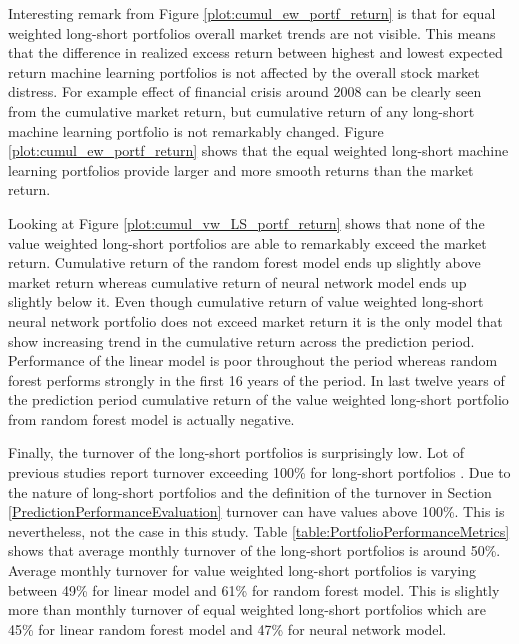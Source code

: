\documentclass{article}
\begin{document}
Interesting remark from Figure \ref{plot:cumul_ew_portf_return} is that for equal weighted long-short portfolios overall market trends are not visible. This means that the difference in realized excess return between highest and lowest expected return machine learning portfolios is not affected by the overall stock market distress. For example effect of financial crisis around 2008 can be clearly seen from the cumulative market return, but cumulative return of any long-short machine learning portfolio is not remarkably changed. Figure \ref{plot:cumul_ew_portf_return} shows that the equal weighted long-short machine learning portfolios provide larger and more smooth returns than the market return. \par

Looking at Figure \ref{plot:cumul_vw_LS_portf_return} shows that none of the value weighted long-short portfolios are able to remarkably exceed the market return. Cumulative return of the random forest model ends up slightly above market return whereas cumulative return of neural network model ends up slightly below it. Even though cumulative return of value weighted long-short neural network portfolio does not exceed market return it is the only model that show increasing trend in the cumulative return across the prediction period. Performance of the linear model is poor throughout the period whereas random forest performs strongly in the first 16 years of the period. In last twelve years of the prediction period cumulative return of the value weighted long-short portfolio from random forest model is actually negative. \par

Finally, the turnover of the long-short portfolios is surprisingly low. Lot of previous studies report turnover exceeding 100\% for long-short portfolios \cite{guetal, TOBEK2021100588}. Due to the nature of long-short portfolios and the definition of the turnover in Section \ref{PredictionPerformanceEvaluation} turnover can have values above 100\%. This is nevertheless, not the case in this study. Table \ref{table:PortfolioPerformanceMetrics} shows that average monthly turnover of the long-short portfolios is around 50\%. Average monthly turnover for value weighted long-short portfolios is varying between 49\% for linear model and 61\% for random forest model. This is slightly more than monthly turnover of equal weighted long-short portfolios which are 45\% for linear random forest model and 47\% for neural network model. \par
\end{document}
